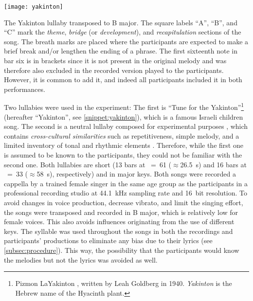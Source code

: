\begin{snippet}[t]
	\centering
	\texttt{[image: yakinton]}
	\caption{The Yakinton lullaby transposed to B major.
		The square labels \enquote{A}, \enquote{B}, and \enquote{C} mark the \emph{theme}, \emph{bridge} (or \emph{development}), and \emph{recapitulation} sections of the song.
		The breath marks are placed where the participants are expected to make a brief break and/or lengthen the ending of a phrase.
		The first sixteenth note in bar six is in brackets since it is not present in the original melody and was therefore also excluded in the recorded version played to the participants.
		However, it is common to add it, and indeed all participants included it in both performances.}
	\label{snippet:yakinton}
\end{snippet}


Two lullabies were used in the experiment: The first is \enquote{Tune for the Yakinton}\footnote{Pizmon LaYakinton%
, written by Leah Goldberg in 1940. \emph{Yakinton} is the Hebrew name of the Hyacinth plant.} (hereafter \enquote{Yakinton}, see \cref{snippet:yakinton}), which is a famous Israeli children song.
The second is a neutral lullaby composed for experimental purposes \citep[][pp.~22-47, see \cref{snippet:uni-lullaby}]{Twig2016universal}, which contains \emph{cross-cultural similarities} such as repetitiveness, simple melody, and a limited inventory of tonal and rhythmic elements \citep{Unyk1992lullabies, Trehub1993maternal}.
Therefore, while the first one is assumed to be known to the participants, they could not be familiar with the second one.
Both lullabies are short (13 bars at \musQuarter~=~61 ($\approx$\SI{26.5}{\second}) and 16 bars at \musQuarterDotted~=~33 ($\approx$\SI{58}{\second}), respectively) and in major keys.
Both songs were recorded a cappella by a trained female singer in the same age group as the participants in a professional recording studio at \SI{44.1}{\kilo\hertz} sampling rate and 16~bit resolution.
To avoid changes in voice production, decrease vibrato, and limit the singing effort, the songs were transposed and recorded in B major, which is relatively low for female voices.
This also avoids influences originating from the use of different keys.
The syllable \textipa{[na]} was used throughout the songs in both the recordings and participants' productions to eliminate any bias due to their lyrics (see \cref{subsec:procedure}).
This way, the possibility that the participants would know the melodies but not the lyrics was avoided as well.

